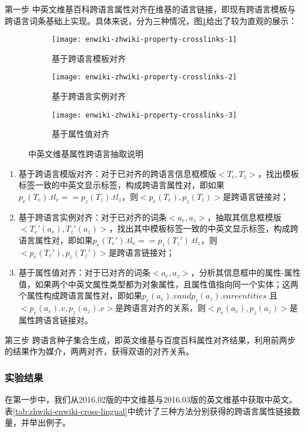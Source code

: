 {\heiti 第一步 中英文维基百科跨语言属性对齐}在维基的语言链接，即现有跨语言模板与跨语言词条基础上实现。具体来说，分为三种情况，图\ref{fig:cross-lingual-seed}给出了较为直观的展示：

\begin{figure}[h]
  \centering%
  \begin{subfigure}{3cm}
    \texttt{[image: enwiki-zhwiki-property-crosslinks-1]}
    \caption{基于跨语言模板对齐}
  \end{subfigure}%
  \hspace{4em}%
  \begin{subfigure}{0.5\textwidth}
    \texttt{[image: enwiki-zhwiki-property-crosslinks-2]}
    \caption{基于跨语言实例对齐}
  \end{subfigure}
  \begin{subfigure}{0.5\textwidth}
    \texttt{[image: enwiki-zhwiki-property-crosslinks-3]}
    \caption{基于属性值对齐}
  \end{subfigure}
  \caption{中英文维基属性跨语言抽取说明}
  \label{fig:cross-lingual-seed}
\end{figure}

\begin{enumerate}[1)]
\item  {\heiti 基于跨语言模版对齐：}对于已对齐的跨语言信息框模版$<T_e, T_z>$，找出模板标签一致的中英文显示标签，构成跨语言属性对，即如果$p_e(T_e).tl_e == p_z(T_z).tl_z$，则$<p_e(T_e), p_z(T_z)>$是跨语言链接对；
\item  {\heiti 基于跨语言实例对齐：}对于已对齐的词条$<a_e, a_z>$，抽取其信息框模版$<T_e'(a_e), T_z'(a_z)>$，找出其中模板标签一致的中英文显示标签，构成跨语言属性对，即如果$p_e(T_e').tl_e == p_z(T_z').tl_z$，则$<p_e(T_e'), p_z(T_z')>$是跨语言链接对；
\item  {\heiti 基于属性值对齐：}对于已对齐的词条$<a_e, a_z>$，分析其信息框中的属性-属性值，如果两个中英文属性类型都为对象属性，且属性值指向同一个实体；这两个属性构成跨语言属性对，即如果$p_e(a_e).v and p_z(a_z).v are entities$ 且 $<p_e(a_e).v, p_z(a_z).v>$是跨语言对齐的关系，则$<p_e(a_e), p_z(a_z)>$是属性跨语言链接对。
\end{enumerate}

{\heiti 第三步 跨语言种子集合生成}，即英文维基与百度百科属性对齐结果，利用前两步的结果作为媒介，两两对齐，获得双语的对齐关系。

\subsubsection{实验结果}
在第一步中，我们从2016.02版的中文维基与2016.03版的英文维基中获取中英文。表\ref{tab:zhwiki-enwiki-cross-lingual}中统计了三种方法分别获得的跨语言属性链接数量，并举出例子。

